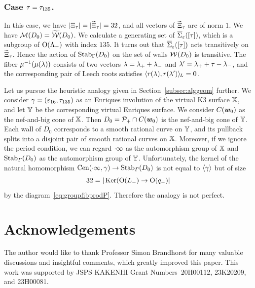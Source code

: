 \documentclass{amsart} %
\begin{document}
\subsubsection{Case $\tau=\tau_{135}$.}
In this case,
we have $|\Xi_{\tau}|=|\widetilde{\Xi}_{\tau}|=32$,
and all vectors of $\widetilde{\Xi}_{\tau}$ are of norm $1$.
We have $\mathord{\mathcal{M}}(D_0)=\widetilde{\mathord{\mathcal{W}}}(D_0)$.
We calculate a generating set of $\overline{\Sigma}_{\varepsilon} ([\tau])$,
which is a subgroup of $ \mathord{\mathrm{O}}(\Lambda_{-})$ with index $135$.
It turns out that $\overline{\Sigma}_{\varepsilon} ([\tau])$ acts transitively on $\widetilde{\Xi}_{\tau}$.
Hence the action of $\operatorname{Stab}_{\Gamma}(D_0)$ on the set of walls $\mathord{\mathcal{W}}(D_0)$ is transitive.
The fiber 
 $\mu^{-1}(\mu(\lambda))$ 
consists of two vectors
$\lambda={\lambda}_{+}+{\lambda}_{-}$ and $\lambda^{\prime}={\lambda}_{+}+\tau-{\lambda}_{-}$, and 
the corresponding pair of Leech roots 
 satisfies
$\langle r(\lambda), r(\lambda^{\prime}) \rangle_{\hskip -1pt L}=0$.
%
 
 \begin{remark}\label{rem:further}
 Let us pursue the heuristic analogy given in Section~\ref{subsec:alggeom} further.
We consider $\gamma=(\varepsilon_{16}, \tau_{135})$ as an Enriques involution of 
the virtual K3 surface $\mathord{\mathbb{X}}$,
and let $\mathord{\mathbb{Y}}$ be the corresponding virtual Enriques surface.
We consider $\mathord{C}(\boldsymbol{w}_0)$ as the nef-and-big cone of $\mathord{\mathbb{X}}$.
Then $D_0=\mathord{\mathcal{P}}_{+}\cap \mathord{C}(\boldsymbol{w}_0)$ is the nef-and-big cone of $\mathord{\mathbb{Y}}$.
Each wall of $D_0$ corresponds to a smooth rational curve on $\mathord{\mathbb{Y}}$,
and its pullback  splits into a disjoint pair of smooth rational curves on $\mathord{\mathbb{X}}$.
Moreover, if we ignore the period condition, 
we can regard $\cdot \infty$ as the automorphism group of $\mathord{\mathbb{X}}$ 
and $\operatorname{Stab}_{\varGamma}(D_0)$  as the automorphism group of $\mathord{\mathbb{Y}}$.
Unfortunately, the kernel of 
the natural homomorphism $\mathrm{Cen}(\cdot \infty,\gamma)\to\operatorname{Stab}_{\varGamma}(D_0)$
is not equal to $\langle {\gamma} \rangle$  but  of size 
\[
32=|\operatorname{Ker}(\mathord{\mathrm{O}}(L_{-}) \to \mathord{\mathrm{O}}(q_{-})|
\]
by the diagram~\eqref{eq:groupfibprodP}.
Therefore  the analogy is  not perfect.
 \end{remark}
\section*{Acknowledgements}
The author would like to thank Professor Simon Brandhorst for many valuable discussions and insightful comments, which greatly improved this paper.
This work was supported by JSPS KAKENHI Grant Numbers~20H00112, 23K20209, and 23H00081.
%
%
%



%
\end{document}
